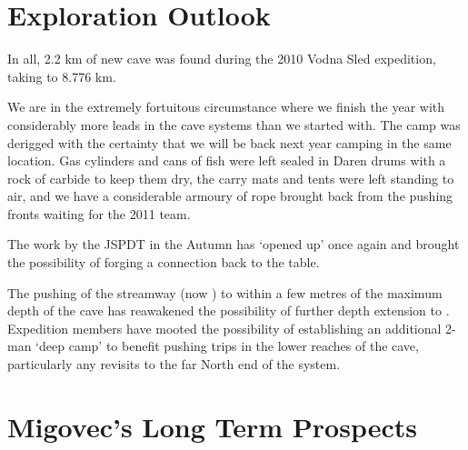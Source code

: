 
\section{Exploration Outlook}

In all, 2.2 km of new cave was found during the 2010 Vodna Sled
expedition, taking  to 8.776 km.

We are in the extremely fortuitous circumstance where we finish the year
with considerably more leads in the  cave systems than we started
with. The  camp was derigged with the certainty that we
will be back next year camping in the same location. Gas cylinders and
cans of fish were left sealed in Daren drums with a rock of carbide to
keep them dry, the carry mats and tents were left standing to air, and
we have a considerable armoury of rope brought back from the pushing
fronts waiting for the 2011 team.


The work by the JSPDT in the Autumn has `opened up'  once again
and brought the possibility of forging a connection back to the table.

The pushing of the  streamway (now ) to within a
few metres of the maximum depth of the cave has reawakened the
possibility of further depth extension to . Expedition
members have mooted the possibility of establishing an additional 2-man
`deep camp' to benefit pushing trips in the lower reaches of the cave,
particularly any revisits to the far North end of the system.


\section{Migovec's Long Term Prospects}


